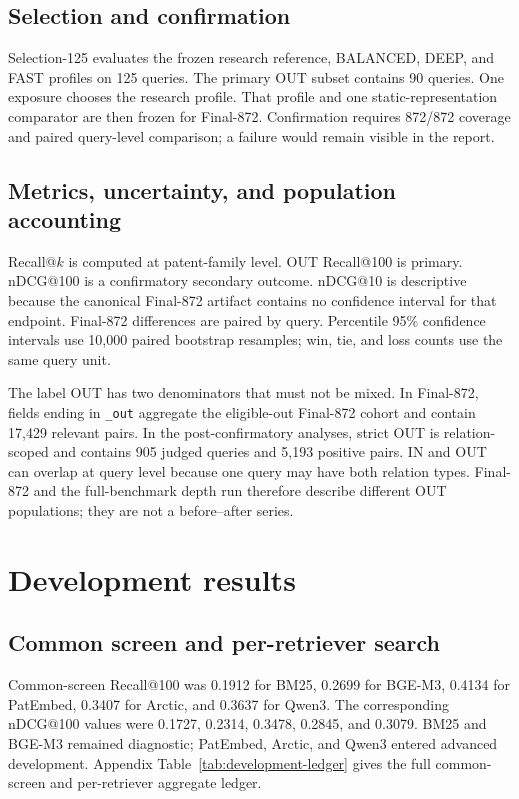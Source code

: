 \documentclass[final,5p,times,twocolumn]{elsarticle}
\begin{document}
\subsection{Selection and confirmation}

Selection-125 evaluates the frozen research reference, BALANCED, DEEP, and FAST profiles
on 125 queries. The primary OUT subset contains 90 queries. One exposure
chooses the research profile. That profile and one static-representation
comparator are then frozen for Final-872. Confirmation requires 872/872 coverage and
paired query-level comparison; a failure would remain visible in the report.

\subsection{Metrics, uncertainty, and population accounting}

Recall@\(k\) is computed at patent-family level. OUT Recall@100 is primary.
nDCG@100 is a confirmatory secondary outcome. nDCG@10 is descriptive because
the canonical Final-872 artifact contains no confidence interval for that
endpoint. Final-872 differences are paired by query. Percentile 95\%
confidence intervals use
10,000 paired bootstrap resamples; win, tie, and loss counts use the same
query unit.

The label OUT has two denominators that must not be mixed. In Final-872, fields ending
in \texttt{\_out} aggregate the eligible-out Final-872 cohort and contain
17,429 relevant pairs. In the post-confirmatory analyses, strict OUT is
relation-scoped and contains
905 judged queries and 5,193 positive pairs. IN and OUT can overlap at query
level because one query may have both relation types. Final-872 and the
full-benchmark depth run therefore describe different OUT populations; they
are not a before--after series.

\section{Development results}\label{sec:development}

\subsection{Common screen and per-retriever search}

Common-screen Recall@100 was 0.1912 for BM25, 0.2699 for BGE-M3, 0.4134 for
PatEmbed, 0.3407 for Arctic, and 0.3637 for Qwen3. The corresponding nDCG@100
values were 0.1727, 0.2314, 0.3478, 0.2845, and 0.3079. BM25 and BGE-M3
remained diagnostic; PatEmbed, Arctic, and Qwen3 entered advanced development.
Appendix Table~\ref{tab:development-ledger} gives the full common-screen and
per-retriever aggregate ledger.
\end{document}

